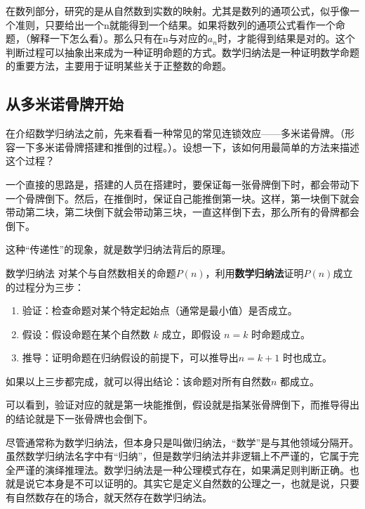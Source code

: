 
\begin{issues}
\issueDraft
\end{issues}



在数列部分，研究的是从自然数到实数的映射。尤其是数列的通项公式，似乎像一个准则，只要给出一个n就能得到一个结果。如果将数列的通项公式看作一个命题，（解释一下怎么看）。那么只有在n与对应的$a_n$时，才能得到结果是对的。这个判断过程可以抽象出来成为一种证明命题的方式。数学归纳法是一种证明数学命题的重要方法，主要用于证明某些关于正整数的命题。

\subsection{从多米诺骨牌开始}

在介绍数学归纳法之前，先来看看一种常见的常见连锁效应——多米诺骨牌。（形容一下多米诺骨牌搭建和推倒的过程。）。设想一下，该如何用最简单的方法来描述这个过程？

一个直接的思路是，搭建的人员在搭建时，要保证每一张骨牌倒下时，都会带动下一个骨牌倒下。然后，在推倒时，保证自己能推倒第一块。这样，第一块倒下就会带动第二块，第二块倒下就会带动第三块，一直这样倒下去，那么所有的骨牌都会倒下。

这种“传递性”的现象，就是数学归纳法背后的原理。

\begin{definition}{数学归纳法}
对某个与自然数相关的命题$P(n)$，利用\textbf{数学归纳法}证明$P(n)$成立的过程分为三步：
\begin{enumerate}
\item 验证：检查命题对某个特定起始点（通常是最小值）是否成立。
\item 假设：假设命题在某个自然数 $k$ 成立，即假设 $n = k$ 时命题成立。
\item 推导：证明命题在归纳假设的前提下，可以推导出$n = k+1$ 时也成立。
\end{enumerate}
如果以上三步都完成，就可以得出结论：该命题对所有自然数$n$ 都成立。
\end{definition}

可以看到，验证对应的就是第一块能推倒，假设就是指某张骨牌倒下，而推导得出的结论就是下一张骨牌也会倒下。

尽管通常称为数学归纳法，但本身只是叫做归纳法，“数学”是与其他领域分隔开。虽然数学归纳法名字中有“归纳”，但是数学归纳法并非逻辑上不严谨的，它属于完全严谨的演绎推理法。数学归纳法是一种公理模式存在，如果满足则判断正确。也就是说它本身是不可以证明的。其实它是定义自然数的公理之一，也就是说，只要有自然数存在的场合，就天然存在数学归纳法。

